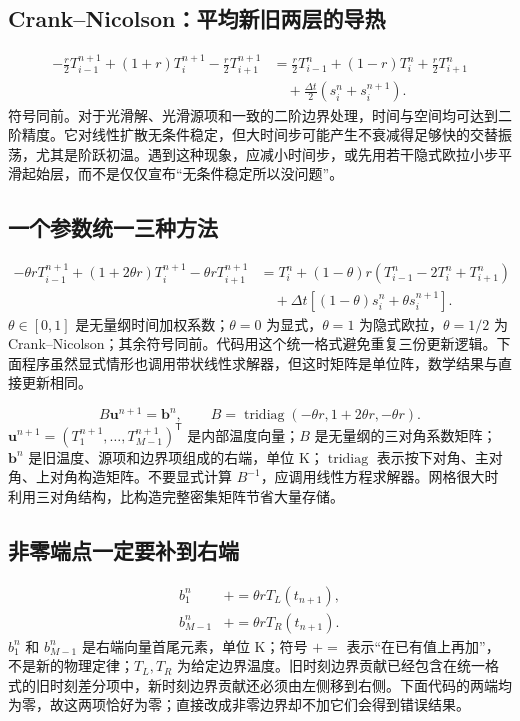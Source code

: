 \documentclass[UTF8,zihao=-4,openany,oneside,fontset=windows]{ctexbook}
\begin{document}
\subsection{Crank--Nicolson：平均新旧两层的导热}
\begin{align}
-\frac r2T_{i-1}^{n+1}+(1+r)T_i^{n+1}-\frac r2T_{i+1}^{n+1}
&=\frac r2T_{i-1}^n+(1-r)T_i^n+\frac r2T_{i+1}^n\\
&\quad+\frac{\Delta t}{2}(s_i^n+s_i^{n+1}).
\end{align}
符号同前。对于光滑解、光滑源项和一致的二阶边界处理，时间与空间均可达到二阶精度。它对线性扩散无条件稳定，但大时间步可能产生不衰减得足够快的交替振荡，尤其是阶跃初温。遇到这种现象，应减小时间步，或先用若干隐式欧拉小步平滑起始层，而不是仅仅宣布“无条件稳定所以没问题”。

\subsection{一个参数统一三种方法}
\begin{align}
-\theta rT_{i-1}^{n+1}+(1+2\theta r)T_i^{n+1}-\theta rT_{i+1}^{n+1}
&=T_i^n+(1-\theta)r(T_{i-1}^n-2T_i^n+T_{i+1}^n)\\
&\quad+\Delta t[(1-\theta)s_i^n+\theta s_i^{n+1}].
\end{align}
$\theta\in[0,1]$ 是无量纲时间加权系数；$\theta=0$ 为显式，$\theta=1$ 为隐式欧拉，$\theta=1/2$ 为 Crank--Nicolson；其余符号同前。代码用这个统一格式避免重复三份更新逻辑。下面程序虽然显式情形也调用带状线性求解器，但这时矩阵是单位阵，数学结果与直接更新相同。

\begin{equation}
B\boldsymbol u^{n+1}=\boldsymbol b^n,\qquad
B=\operatorname{tridiag}(-\theta r,1+2\theta r,-\theta r).
\end{equation}
$\boldsymbol u^{n+1}=(T_1^{n+1},\ldots,T_{M-1}^{n+1})^{\mathsf T}$ 是内部温度向量；$B$ 是无量纲的三对角系数矩阵；$\boldsymbol b^n$ 是旧温度、源项和边界项组成的右端，单位 K；$\operatorname{tridiag}$ 表示按下对角、主对角、上对角构造矩阵。不要显式计算 $B^{-1}$，应调用线性方程求解器。网格很大时利用三对角结构，比构造完整密集矩阵节省大量存储。

\subsection{非零端点一定要补到右端}
\begin{align}
b_1^n&\mathrel{+}=\theta rT_L(t_{n+1}),\\
b_{M-1}^n&\mathrel{+}=\theta rT_R(t_{n+1}).
\end{align}
$b_1^n$ 和 $b_{M-1}^n$ 是右端向量首尾元素，单位 K；符号 $\mathrel{+}=$ 表示“在已有值上再加”，不是新的物理定律；$T_L,T_R$ 为给定边界温度。旧时刻边界贡献已经包含在统一格式的旧时刻差分项中，新时刻边界贡献还必须由左侧移到右侧。下面代码的两端均为零，故这两项恰好为零；直接改成非零边界却不加它们会得到错误结果。
\end{document}
